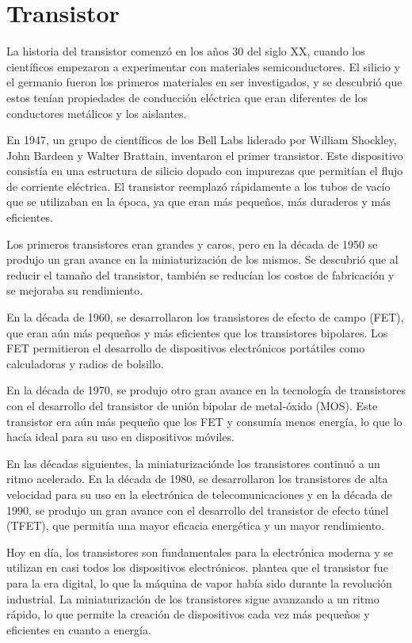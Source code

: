 \documentclass{article}
\begin{document}
\section*{Transistor}

La historia del transistor comenzó en los años 30 del siglo XX, cuando los científicos empezaron a experimentar
con materiales semiconductores. El silicio y el germanio fueron los primeros materiales en ser investigados, 
y se descubrió que estos tenían propiedades de conducción eléctrica que eran diferentes de los conductores metálicos
y los aislantes.

En 1947, un grupo de científicos de los Bell Labs liderado por William Shockley, John Bardeen y Walter Brattain, 
inventaron el primer transistor. Este dispositivo consistía en una estructura de silicio dopado con impurezas que 
permitían el flujo de corriente eléctrica. El transistor reemplazó rápidamente a los tubos de vacío 
que se utilizaban en la época, ya que eran más pequeños, más duraderos y más eficientes.

Los primeros transistores eran grandes y caros, pero en la década de 1950 se produjo un gran avance en la miniaturización
de los mismos. Se descubrió que al reducir el tamaño del transistor, también se reducían los costos de fabricación y se 
mejoraba su rendimiento.

En la década de 1960, se desarrollaron los transistores de efecto de campo (FET), que eran aún más 
pequeños y más eficientes que los transistores bipolares. Los FET permitieron el desarrollo de dispositivos 
electrónicos portátiles como calculadoras y radios de bolsillo. 

En la década de 1970, se produjo otro gran avance en la tecnología de transistores con el desarrollo del 
transistor de unión bipolar de metal-óxido (MOS). Este transistor era aún más pequeño que los FET y consumía 
menos energía, lo que lo hacía ideal para su uso en dispositivos móviles. 

En las décadas siguientes, la miniaturizaciónde los transistores continuó a un ritmo acelerado. En la década de 1980, 
se desarrollaron los transistores de alta velocidad para su uso en la electrónica de telecomunicaciones y en la década
de 1990, se produjo un gran avance con el desarrollo del transistor de efecto túnel (TFET), que permitía una mayor 
eficacia energética y un mayor rendimiento.

Hoy en día, los transistores son fundamentales para la electrónica moderna y se utilizan en casi todos los 
dispositivos electrónicos. \cite{isaacson2019innovadores} plantea que el transistor fue para la era digital, lo que la máquina de vapor había
sido durante la revolución industrial.
La miniaturización de los transistores sigue avanzando a un ritmo rápido, lo que permite la creación de 
dispositivos cada vez más pequeños y eficientes en cuanto a energía.
\end{document}
